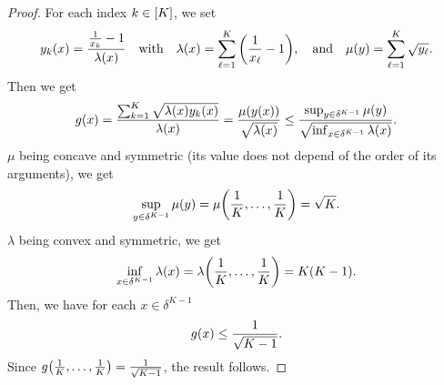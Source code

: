 \begin{proof}
For each index $k\in\range{K}$, we set
\begin{equation}
  y_k\bracket{x} = \frac{\frac{1}{x_k}-1}{\lambda\bracket{x}}
  \quad\mbox{with}\quad
  \lambda\bracket{x} = \sum_{\ell=1}^K\bracket{\frac{1}{x_{\ell}}-1}
  ,\quad\mbox{and}\quad 
  \mu\bracket{y} = \sum_{\ell=1}^K \sqrt{y_{\ell}}.
\end{equation}
Then we get
\begin{equation}
  g\bracket{x} = \frac{\sum_{k=1}^K\sqrt{\lambda\bracket{x}y_k\bracket{x}}}{\lambda\bracket{x}}
  = \frac{\mu\bracket{y\bracket{x}}}{\sqrt{\lambda\bracket{x}}}
  \le \frac{\sup_{y\in\delta^{K-1}}\mu\bracket{y}}{\sqrt{\inf_{x\in\delta^{K-1}}\lambda\bracket{x}}}.
\end{equation}
$\mu$ being concave and symmetric (\ie its value does not depend of the order of its arguments), we get
\begin{equation}
  \sup_{y\in\delta^{K-1}}\mu\bracket{y} = \mu\bracket{\frac{1}{K},\ldots,\frac{1}{K}} = \sqrt{K}.
\end{equation}
$\lambda$ being convex and symmetric, we get
\begin{equation}
  \inf_{x\in\delta^{K-1}}\lambda\bracket{x} = \lambda\bracket{\frac{1}{K},\ldots,\frac{1}{K}} = K\bracket{K-1}.
\end{equation}
Then, we have for each $x\in\delta^{K-1}$
\begin{equation}
  g\bracket{x} \le \frac{1}{\sqrt{K-1}}.
\end{equation}
Since $g\bracket{\frac{1}{K},\ldots,\frac{1}{K}}=\frac{1}{\sqrt{K-1}}$, the result follows.
\end{proof}


